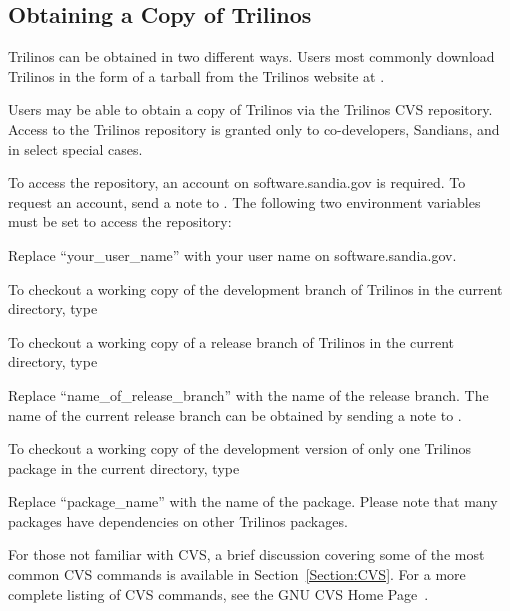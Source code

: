 \documentclass[12pt,relax]{TrilinosUserGuide}
\begin{document}
\subsection{Obtaining a Copy of Trilinos}

Trilinos can be obtained in two different ways.  Users most commonly 
download Trilinos in the form of a tarball from the Trilinos website at 
\newline {}.

Users may be able to obtain a 
copy of Trilinos via the Trilinos CVS repository.  Access to the Trilinos 
repository is granted only to co-developers, Sandians, and in select 
special cases.

To access the repository, an account on software.sandia.gov is required.  
To request an account, send a note 
to .  
The following two environment variables must be set to access the repository:


Replace ``your\_user\_name'' with your user name on software.sandia.gov.

To checkout a working copy of the development branch of Trilinos in the 
current directory, type


To checkout a working copy of a release branch of Trilinos in the current 
directory, type


Replace ``name\_of\_release\_branch'' with the name of the release branch.
The name of the current release branch can be obtained by sending a note to
\newline {}.

To checkout a working copy of the development version of only one Trilinos 
package in the current directory, type


Replace ``package\_name'' with the name of the package.  Please note 
that many packages have dependencies on other Trilinos packages.

For those not familiar with CVS, a brief discussion covering some of the most 
common CVS commands is available in Section~\ref{Section:CVS}.  For a more 
complete listing of CVS commands, see the GNU CVS Home Page~\cite{CVS}.
\end{document}
